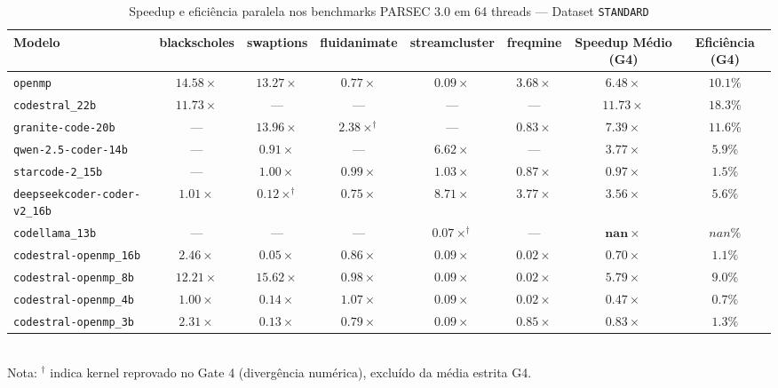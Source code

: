 \begin{table}[htbp]
\centering
\caption{Speedup e eficiência paralela nos benchmarks PARSEC 3.0 em 64 threads — Dataset \texttt{STANDARD}}
\label{tab:parsec_scale_standard}
\small
\begin{tabular}{lccccc cc}
\toprule
\textbf{Modelo} & \textbf{blackscholes} & \textbf{swaptions} & \textbf{fluidanimate} & \textbf{streamcluster} & \textbf{freqmine} & \textbf{Speedup Médio (G4)} & \textbf{Eficiência (G4)} \\
\midrule
\texttt{openmp} & $14.58\times$ & $13.27\times$ & $0.77\times$ & $0.09\times$ & $3.68\times$ & $\mathbf{6.48\times}$ & $10.1\%$ \\
\texttt{codestral\_22b} & $11.73\times$ & --- & --- & --- & --- & $\mathbf{11.73\times}$ & $18.3\%$ \\
\texttt{granite-code-20b} & --- & $13.96\times$ & $2.38\times^\dagger$ & --- & $0.83\times$ & $\mathbf{7.39\times}$ & $11.6\%$ \\
\texttt{qwen-2.5-coder-14b} & --- & $0.91\times$ & --- & $6.62\times$ & --- & $\mathbf{3.77\times}$ & $5.9\%$ \\
\texttt{starcode-2\_15b} & --- & $1.00\times$ & $0.99\times$ & $1.03\times$ & $0.87\times$ & $\mathbf{0.97\times}$ & $1.5\%$ \\
\texttt{deepseekcoder-coder-v2\_16b} & $1.01\times$ & $0.12\times^\dagger$ & $0.75\times$ & $8.71\times$ & $3.77\times$ & $\mathbf{3.56\times}$ & $5.6\%$ \\
\texttt{codellama\_13b} & --- & --- & --- & $0.07\times^\dagger$ & --- & $\mathbf{nan\times}$ & $nan\%$ \\
\texttt{codestral-openmp\_16b} & $2.46\times$ & $0.05\times$ & $0.86\times$ & $0.09\times$ & $0.02\times$ & $\mathbf{0.70\times}$ & $1.1\%$ \\
\texttt{codestral-openmp\_8b} & $12.21\times$ & $15.62\times$ & $0.98\times$ & $0.09\times$ & $0.02\times$ & $\mathbf{5.79\times}$ & $9.0\%$ \\
\texttt{codestral-openmp\_4b} & $1.00\times$ & $0.14\times$ & $1.07\times$ & $0.09\times$ & $0.02\times$ & $\mathbf{0.47\times}$ & $0.7\%$ \\
\texttt{codestral-openmp\_3b} & $2.31\times$ & $0.13\times$ & $0.79\times$ & $0.09\times$ & $0.85\times$ & $\mathbf{0.83\times}$ & $1.3\%$ \\
\bottomrule
\end{tabular}
\\[4pt]
\footnotesize{Nota: $^\dagger$ indica kernel reprovado no Gate 4 (divergência numérica), excluído da média estrita G4.}
\end{table}
